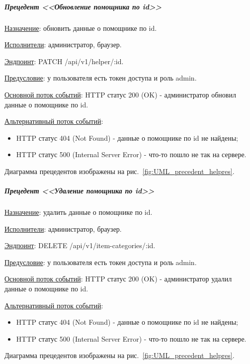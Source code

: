 \subparagraph{Прецедент <<Обновление помощника по id>>} \hspace{0pt}

\underline{Назначение}: обновить данные о помощнике по id.

\underline{Исполнители}: администратор, браузер.

\underline{Эндпоинт}: PATCH /api/v1/helper/:id.

\underline{Предусловие}: у пользователя есть токен доступа и роль admin.

\underline{Основной поток событий}: HTTP статус 200 (OK) - администратор обновил данные о помощнике по id. 

\underline{Альтернативный поток событий}:

\begin{itemize}
    \item HTTP статус 404 (Not Found) - данные о помощнике по id не найдены;
    \item HTTP статус 500 (Internal Server Error) - что-то пошло не так на сервере.
\end{itemize}

Диаграмма прецедентов изображены на рис.~\ref{fig:UML_precedent_helpres}.


\subparagraph{Прецедент <<Удаление помощника по id>>} \hspace{0pt}

\underline{Назначение}: удалить данные о помощнике по id.

\underline{Исполнители}: администратор, браузер.

\underline{Эндпоинт}: DELETE /api/v1/item-categories/:id.

\underline{Предусловие}: у пользователя есть токен доступа и роль admin.

\underline{Основной поток событий}: HTTP статус 200 (OK) - администратор удалил данные о помощнике по id. 

\underline{Альтернативный поток событий}:

\begin{itemize}
    \item HTTP статус 404 (Not Found) - данные о помощнике по id не найдены;
    \item HTTP статус 500 (Internal Server Error) - что-то пошло не так на сервере.
\end{itemize}

Диаграмма прецедентов изображены на рис.~\ref{fig:UML_precedent_helpres}.

